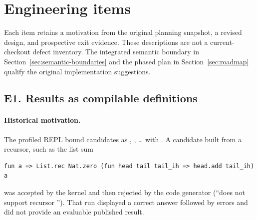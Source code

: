 \section{Engineering items}\label{sec:engineering}

Each item retains a motivation from the original  planning
snapshot, a revised design, and prospective exit evidence. These descriptions
are not a current-checkout defect inventory. The integrated semantic boundary
in Section~\ref{sec:semantic-boundaries} and the phased plan in
Section~\ref{sec:roadmap} qualify the original implementation suggestions.

\subsection{E1. Results as compilable definitions}

\paragraph{Historical motivation.} The profiled REPL bound candidates as
, , \dots{} with . A candidate built
from a recursor, such as the list sum
\begin{lstlisting}
fun a => List.rec Nat.zero (fun head tail tail_ih => head.add tail_ih) a
\end{lstlisting}
was accepted by the kernel and then rejected by the code generator (``does not
support recursor ''). That run displayed a correct answer
followed by errors and did not provide an evaluable published result.

